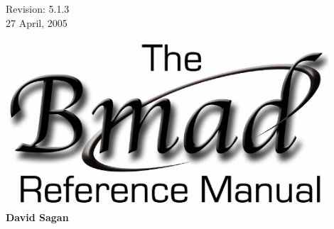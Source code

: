 \thispagestyle{empty}

\begin{flushright}
\large
  Revision: 5.1.3 \\
  27 April, 2005 \\
\end{flushright}

\vfill

{
\begin{center}
\includegraphics[width=12cm]{bmad_ref_manual.eps} \\
\vskip 0.3in
\huge\bf David Sagan
\end{center}
}

\vfill
\break